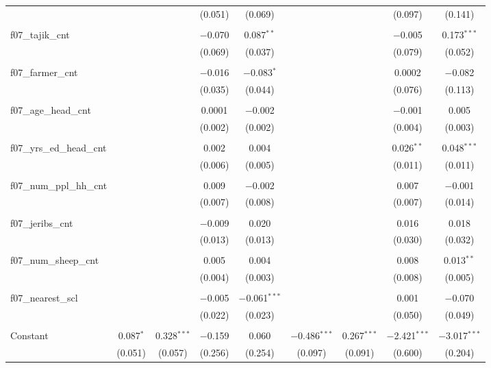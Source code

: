 \documentclass[
]{article}
\begin{document}
\begin{table}[!htbp]
\begin{tabular}{@{\extracolsep{5pt}}lcccccccc}
  &  &  & (0.051) & (0.069) &  &  & (0.097) & (0.141) \\ 
  & & & & & & & & \\ 
 f07\_tajik\_cnt &  &  & $-$0.070 & 0.087$^{**}$ &  &  & $-$0.005 & 0.173$^{***}$ \\ 
  &  &  & (0.069) & (0.037) &  &  & (0.079) & (0.052) \\ 
  & & & & & & & & \\ 
 f07\_farmer\_cnt &  &  & $-$0.016 & $-$0.083$^{*}$ &  &  & 0.0002 & $-$0.082 \\ 
  &  &  & (0.035) & (0.044) &  &  & (0.076) & (0.113) \\ 
  & & & & & & & & \\ 
 f07\_age\_head\_cnt &  &  & 0.0001 & $-$0.002 &  &  & $-$0.001 & 0.005 \\ 
  &  &  & (0.002) & (0.002) &  &  & (0.004) & (0.003) \\ 
  & & & & & & & & \\ 
 f07\_yrs\_ed\_head\_cnt &  &  & 0.002 & 0.004 &  &  & 0.026$^{**}$ & 0.048$^{***}$ \\ 
  &  &  & (0.006) & (0.005) &  &  & (0.011) & (0.011) \\ 
  & & & & & & & & \\ 
 f07\_num\_ppl\_hh\_cnt &  &  & 0.009 & $-$0.002 &  &  & 0.007 & $-$0.001 \\ 
  &  &  & (0.007) & (0.008) &  &  & (0.007) & (0.014) \\ 
  & & & & & & & & \\ 
 f07\_jeribs\_cnt &  &  & $-$0.009 & 0.020 &  &  & 0.016 & 0.018 \\ 
  &  &  & (0.013) & (0.013) &  &  & (0.030) & (0.032) \\ 
  & & & & & & & & \\ 
 f07\_num\_sheep\_cnt &  &  & 0.005 & 0.004 &  &  & 0.008 & 0.013$^{**}$ \\ 
  &  &  & (0.004) & (0.003) &  &  & (0.008) & (0.005) \\ 
  & & & & & & & & \\ 
 f07\_nearest\_scl &  &  & $-$0.005 & $-$0.061$^{***}$ &  &  & 0.001 & $-$0.070 \\ 
  &  &  & (0.022) & (0.023) &  &  & (0.050) & (0.049) \\ 
  & & & & & & & & \\ 
 Constant & 0.087$^{*}$ & 0.328$^{***}$ & $-$0.159 & 0.060 & $-$0.486$^{***}$ & 0.267$^{***}$ & $-$2.421$^{***}$ & $-$3.017$^{***}$ \\ 
  & (0.051) & (0.057) & (0.256) & (0.254) & (0.097) & (0.091) & (0.600) & (0.204) \\ 

\end{tabular}
\end{table}
\end{document}
